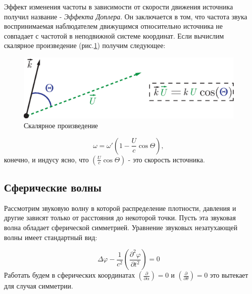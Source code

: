 \documentclass[14pt,a4paper,oneside]{extarticle}	%
\newcommand{\bracket}[1] {\left( #1 \right) } %
\newcommand{\dif}[2] {\bracket{ \frac{\partial #1}{\partial #2} }}
\begin{document}
Эффект изменения частоты в зависимости от скорости движения источника получил название - \textit{Эффекта Доплера}.
Он заключается в том, что частота звука воспринимаемая наблюдателем движущимся относительно источника не совпадает с частотой в неподвижной системе координат.
Если вычислим скалярное произведение (рис.\ref{fig::10}) получим следующее:

\begin{figure}[h!] 	%
	\centering 		%
	\includegraphics[width=12cm]{10.eps} %
	\caption{Скалярное произведение}
	\label{fig::10}
\end{figure}

\begin{equation*}
\omega = \omega'\left( 1- \frac{U}{c}\cos \Theta\right),
\end{equation*}
конечно, и индусу ясно, что $ \left(\frac{U}{c}\cos\Theta\right) $ - это скорость источника.


\begin{center}
		\subsection*{Сферические волны} %
\end{center}
Рассмотрим звуковую волну в которой распределение плотности, давления и другие зависят только от расстояния до некоторой точки. Пусть эта звуковая волна обладает сферической симметрией.
Уравнение звуковых незатухающей волны имеет стандартный вид:

 \begin{equation*}
\Delta\varphi - \frac{1}{c^{2}}\dif{^{2}\varphi}{t^{2}} = 0
 \end{equation*}
Работать будем в сферических координатах $ \dif{}{\alpha} = 0 $ и $ \dif{}{\theta} = 0 $ это вытекает для случая симметрии.
\end{document}
